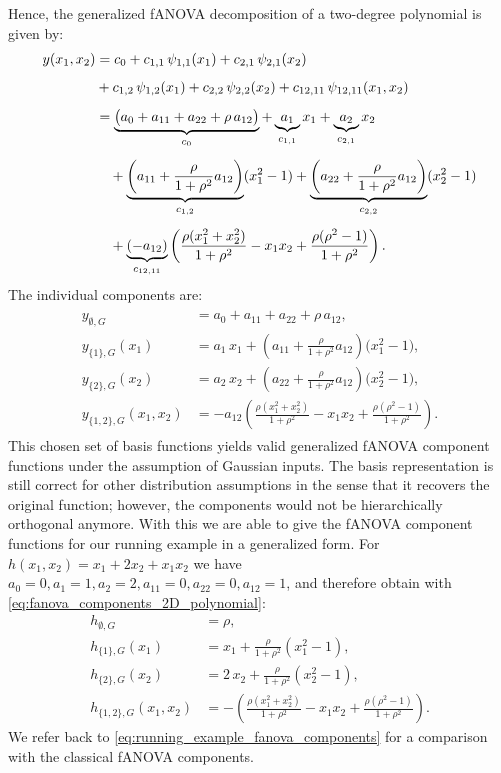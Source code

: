 Hence, the generalized fANOVA decomposition of a two-degree polynomial is given by:
\begin{align*}
y(x_1,x_2) 
&= c_0 
  + c_{1,1}\,\psi_{1,1}(x_1) 
  + c_{2,1}\,\psi_{2,1}(x_2) \\[0.5em]
&+ c_{1,2}\,\psi_{1,2}(x_1)
  + c_{2,2}\,\psi_{2,2}(x_2)
  + c_{12,11}\,\psi_{12,11}(x_1,x_2) \\[0.5em]
&= 
\underbrace{\big(a_0 + a_{11} + a_{22} + \rho\,a_{12}\big)}_{c_0} 
+ \underbrace{a_1}_{c_{1,1}} x_1
+ \underbrace{a_2}_{c_{2,1}} x_2 \\[0.5em]
&\quad 
+ \underbrace{\left(a_{11} + \frac{\rho}{1+\rho^2}a_{12}\right)}_{c_{1,2}} (x_1^2 - 1)
+ \underbrace{\left(a_{22} + \frac{\rho}{1+\rho^2}a_{12}\right)}_{c_{2,2}} (x_2^2 - 1) \notag \\[0.5em]
&\quad 
+ \underbrace{(-a_{12})}_{c_{12, 11}}\left(
    \frac{\rho(x_1^2+x_2^2)}{1+\rho^2} - x_1 x_2 
    + \frac{\rho(\rho^2-1)}{1+\rho^2}
  \right).
\end{align*}
The individual components are:
\begin{align}
\begin{split}
y_{\emptyset, G} &= a_0 + a_{11} + a_{22} + \rho\,a_{12}, \\[0.5em]
y_{\{1\}, G}(x_1) &= a_1\,x_1 
  + \left(a_{11} + \frac{\rho}{1+\rho^2}a_{12}\right)\bigl(x_1^2 - 1\bigr), \\[0.5em]
y_{\{2\}, G}(x_2) &= a_2\,x_2 
  + \left(a_{22} + \frac{\rho}{1+\rho^2}a_{12}\right)\bigl(x_2^2 - 1\bigr), \\[0.5em]
y_{\{1,2\}, G}(x_1,x_2) 
&= -a_{12}\!\left(
    \frac{\rho(x_1^2+x_2^2)}{1+\rho^2} 
    - x_1 x_2 
    + \frac{\rho(\rho^2-1)}{1+\rho^2}
   \right).
\end{split}
\label{eq:fanova_components_2D_polynomial}
\end{align}
This chosen set of basis functions yields valid generalized fANOVA component functions under the assumption of Gaussian inputs. The basis representation is still correct for other distribution assumptions in the sense that it recovers the original function; however, the components would not be hierarchically orthogonal anymore.
With this we are able to give the fANOVA component functions for our running example in a generalized form. For $h(x_1,x_2) = x_1 + 2x_2 + x_1 x_2$  we have $a_0 = 0, a_1 = 1, a_2 = 2, a_{11} = 0, a_{22} = 0, a_{12} = 1$, and therefore obtain with \autoref{eq:fanova_components_2D_polynomial}:
\begin{align*}
h_{\emptyset, G} &= \rho, \\[0.5em]
h_{\{1\}, G}(x_1) &= x_1 + \frac{\rho}{1+\rho^2}(x_1^2 - 1), \\[0.5em]
h_{\{2\}, G}(x_2) &= 2\,x_2 + \frac{\rho}{1+\rho^2}(x_2^2 - 1), \\[0.5em]
h_{\{1,2\}, G}(x_1,x_2) 
&= -\left(\frac{\rho(x_1^2+x_2^2)}{1+\rho^2} - x_1 x_2 + \frac{\rho(\rho^2-1)}{1+\rho^2}\right).
\end{align*}
We refer back to \autoref{eq:running_example_fanova_components} for a comparison with the classical fANOVA components.

